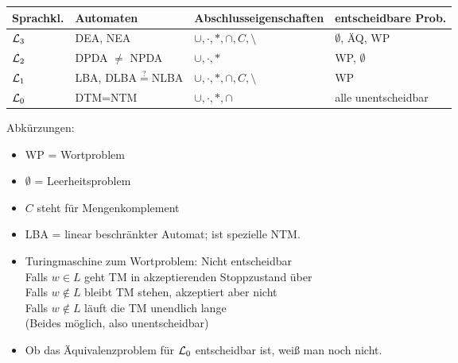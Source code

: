 \begin{tabular}{l|l|l|l}
	Sprachkl. & Automaten & Abschlusseigenschaften & entscheidbare Prob.\\ \hline
	$\mathcal{L}_3$ & DEA, NEA & $\cup,\cdot,\ast,\cap,C,\setminus$ & $\emptyset$, ÄQ, WP \\
	$\mathcal{L}_2$ & DPDA $\neq$ NPDA & $\cup,\cdot,\ast$ & WP, $\emptyset$\\
	$\mathcal{L}_1$ & LBA, DLBA$\overset{?}{=}$NLBA & $\cup,\cdot,\ast,\cap,C,\setminus$ & WP\\
	$\mathcal{L}_0$ & DTM=NTM & $\cup,\cdot,\ast,\cap$ & alle unentscheidbar\\
\end{tabular}

Abkürzungen:
\begin{itemize}
	\item WP = Wortproblem
	\item $\emptyset$ = Leerheitsproblem
	\item $C$ steht für Mengenkomplement
	\item LBA = linear beschränkter Automat; ist spezielle NTM.
\end{itemize}

\begin{itemize}
	\item Turingmaschine zum Wortproblem: Nicht entscheidbar\\
	Falls $w\in L$ geht TM in akzeptierenden Stoppzustand über\\
	Falls $w\not\in L$ bleibt TM stehen, akzeptiert aber nicht\\
	Falls $w\not\in L$ läuft die TM unendlich lange\\
	(Beides möglich, also unentscheidbar)
	\item Ob das Äquivalenzproblem für $\mathcal{L}_0$ entscheidbar ist, weiß man noch nicht.
\end{itemize}